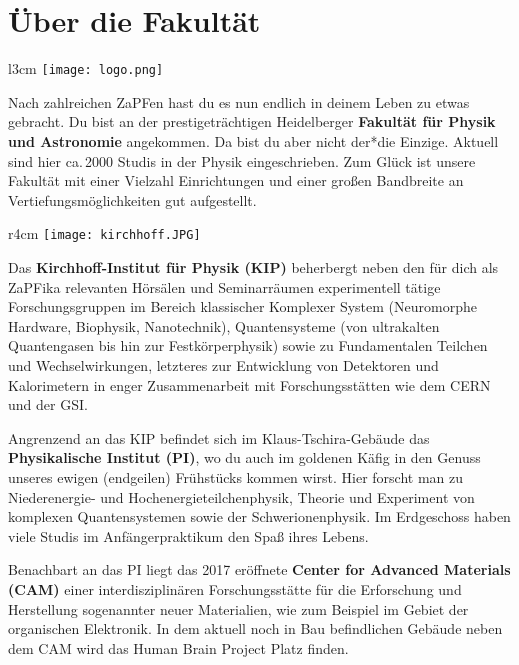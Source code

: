 
\section{Über die Fakultät}

\begin{wrapfigure}{l}{3cm}
\texttt{[image: logo.png]}
\end{wrapfigure}



Nach zahlreichen ZaPFen hast du es nun endlich in deinem Leben zu etwas gebracht. Du bist an der prestigeträchtigen Heidelberger \textbf{Fakultät für Physik und Astronomie} angekommen. Da bist du aber nicht der*die Einzige.
Aktuell sind hier ca.\,2000 Studis in der Physik eingeschrieben.
Zum Glück ist unsere Fakultät mit einer Vielzahl Einrichtungen und einer großen Bandbreite an Vertiefungsmöglichkeiten gut aufgestellt.\\

\begin{wrapfigure}{r}{4cm}
\texttt{[image: kirchhoff.JPG]}
\end{wrapfigure}

Das \textbf{Kirchhoff-Institut für Physik (KIP)} beherbergt neben den für dich als ZaPFika relevanten Hörsälen und Seminarräumen experimentell tätige Forschungsgruppen im Bereich klassischer Komplexer System (Neuromorphe Hardware, Biophysik, Nanotechnik), Quantensysteme (von ultrakalten Quantengasen bis hin zur Festkörperphysik) sowie zu Fundamentalen Teilchen und Wechselwirkungen, letzteres zur Entwicklung von Detektoren und Kalorimetern in enger Zusammenarbeit mit Forschungsstätten wie dem CERN und der GSI.

Angrenzend an das KIP befindet sich im Klaus-Tschira-Gebäude das \textbf{Physikalische Institut (PI)}, wo du auch im goldenen Käfig in den Genuss unseres ewigen (endgeilen) Frühstücks kommen wirst. Hier forscht man zu Niederenergie- und Hochenergieteilchenphysik, Theorie und Experiment von komplexen Quantensystemen sowie der Schwerionenphysik. Im Erdgeschoss haben viele Studis im Anfängerpraktikum den Spaß ihres Lebens.

Benachbart an das PI liegt das 2017 eröffnete \textbf{Center for Advanced Materials (CAM)} einer interdisziplinären Forschungsstätte für die Erforschung und Herstellung sogenannter neuer Materialien, wie zum Beispiel im Gebiet der organischen Elektronik.
In dem aktuell noch in Bau befindlichen Gebäude neben dem CAM wird das Human Brain Project Platz finden. 

